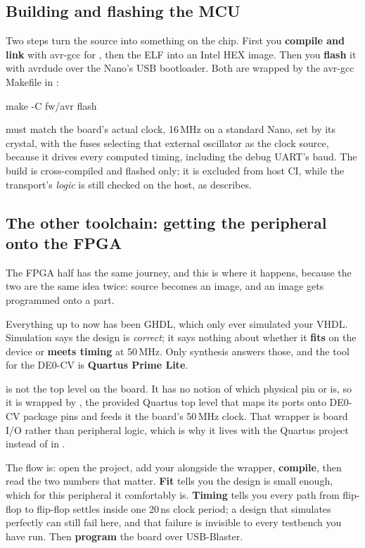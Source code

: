 \subsection{Building and flashing the MCU}
\label{c9:sec:flashing}
Two steps turn the source into something on the chip. First you \textbf{compile and link} with
avr-gcc for , then  the ELF into an Intel HEX image. Then
you \textbf{flash} it with avrdude over the Nano's USB bootloader. Both are wrapped by the avr-gcc
Makefile in :

\begin{shell}
make -C fw/avr flash
\end{shell}

\noindent {} must match the board's actual clock, 16\,MHz on a standard Nano, set by its
crystal, with the fuses selecting that external oscillator as the clock source, because it drives
every computed timing, including the debug UART's baud. The  build is cross-compiled and
flashed only; it is excluded from host CI, while the transport's \emph{logic} is still checked on
the host, as  describes.

\subsection{The other toolchain: getting the peripheral onto the FPGA}
\label{c9:sec:quartus}
The FPGA half has the same journey, and this is where it happens, because the two are the same idea
twice: source becomes an image, and an image gets programmed onto a part.

Everything up to now has been GHDL, which only ever simulated your VHDL. Simulation says the design
is \emph{correct}; it says nothing about whether it \textbf{fits} on the device or \textbf{meets
timing} at 50\,MHz. Only synthesis answers those, and the tool for the DE0-CV is \textbf{Quartus
Prime Lite}.

 is not the top level on the board. It has no notion of which physical pin
 or  is, so it is wrapped by \textbf{}, the provided
Quartus top level that maps its ports onto DE0-CV package pins and feeds it the board's 50\,MHz
clock. That wrapper is board I/O rather than peripheral logic, which is why it lives with the
Quartus project instead of in .

The flow is: open the project, add your  alongside the wrapper, \textbf{compile},
then read the two numbers that matter. \textbf{Fit} tells you the design is small enough, which for
this peripheral it comfortably is. \textbf{Timing} tells you every path from flip-flop to flip-flop
settles inside one 20\,ns clock period; a design that simulates perfectly can still fail here, and
that failure is invisible to every testbench you have run. Then \textbf{program} the board over
USB-Blaster.

